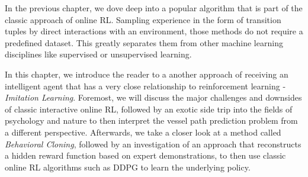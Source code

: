 In the previous chapter, we dove deep into a popular algorithm that is part of the classic approach of online RL. Sampling experience in the form of transition tuples by direct interactions with an environment, those methods do not require a predefined dataset. This greatly separates them from other machine learning disciplines like supervised or unsupervised learning.
\par 
In this chapter, we introduce the reader to a another approach of receiving an intelligent agent that has a very close relationship to reinforcement learning - \textit{Imitation Learning}. Foremost, we will discuss the major challenges and downsides of classic interactive online RL, followed by an exotic side trip into the fields of psychology and nature to then interpret the vessel path prediction problem from a different perspective. Afterwards, we take a closer look at a method called \textit{Behavioral Cloning}, followed by an investigation of an approach that reconstructs a hidden reward function based on expert demonstrations, to then use classic online RL algorithms such as DDPG to learn the underlying policy. 